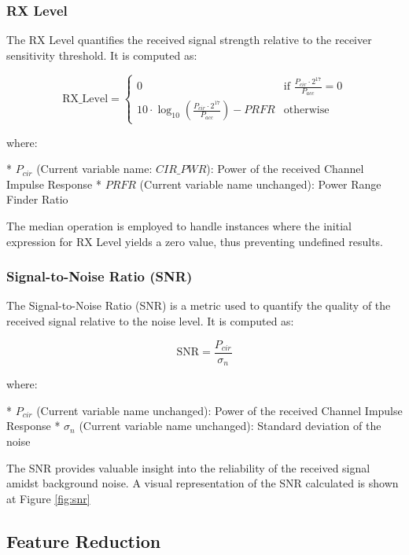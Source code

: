 \documentclass[
	article, %
	11pt, %
]{CSUniSchoolLabReport}
\begin{document}
\subsubsection{RX Level}\label{rx_level}

The RX Level quantifies the received signal strength relative to the receiver sensitivity threshold. It is computed as:

\begin{equation}
  \text{RX\_Level} =
  \begin{cases}
    0 & \text{if } \frac{P_{cir} \cdot 2^{17}}{P_{acc}} = 0 \\
    10 \cdot \log_{10} \left( \frac{P_{cir} \cdot 2^{17}}{P_{acc}} \right) - PRFR & \text{otherwise}
  \end{cases}
\end{equation}

where:

* $P_{cir}$ (Current variable name: $CIR\_PWR$): Power of the received Channel Impulse Response
* $PRFR$ (Current variable name unchanged): Power Range Finder Ratio

The median operation is employed to handle instances where the initial expression for RX Level yields a zero value, thus preventing undefined results.

\subsubsection{Signal-to-Noise Ratio (SNR)}\label{snr}

The Signal-to-Noise Ratio (SNR) is a metric used to quantify the quality of the received signal relative to the noise level. It is computed as:

\begin{equation}
  \text{SNR} = \frac{P_{cir}}{\sigma_n}
\end{equation}

where:

* $P_{cir}$ (Current variable name unchanged): Power of the received Channel Impulse Response
* $\sigma_n$ (Current variable name unchanged): Standard deviation of the noise

The SNR provides valuable insight into the reliability of the received signal amidst background noise. A visual representation of the SNR calculated is shown at Figure \ref{fig:snr}

\subsection{Feature Reduction}\label{feature_reduction}
\end{document}
